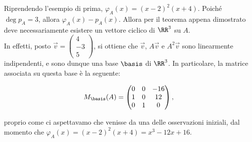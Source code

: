 \documentclass[11pt]{article}
\begin{document}
\begin{example}
    Riprendendo l'esempio di prima, $\varphi_A(x) = (x-2)^2(x+4)$. Poiché $\deg p_A = 3$, allora $\varphi_A(x) - p_A(x)$. Allora per il teorema appena dimostrato deve
    necessariamente esistere un vettore ciclico di $\RR^3$ su
    $A$. \\

    In effetti, posto $\Vec{v} = \begin{pmatrix}
        4 \\ -3 \\ 5
    \end{pmatrix}$, si ottiene che $\Vec{v}$, $A\Vec{v}$ e
    $A^2\Vec{v}$ sono linearmente indipendenti, e sono
    dunque una base $\basis$ di $\RR^3$. In particolare, la
    matrice associata su questa base è la seguente:

    \[ M_\basis(A) = \begin{pmatrix}
        0 & 0 & -16 \\
        1 & 0 & 12 \\
        0 & 1 & 0 \\
    \end{pmatrix}, \]

    \vskip 0.1in

    proprio come ci aspettavamo che venisse da una delle osservazioni
    iniziali, dal momento che $\varphi_A(x) = (x-2)^2(x+4) = x^3 - 12x + 16$.
\end{example}
\end{document}
